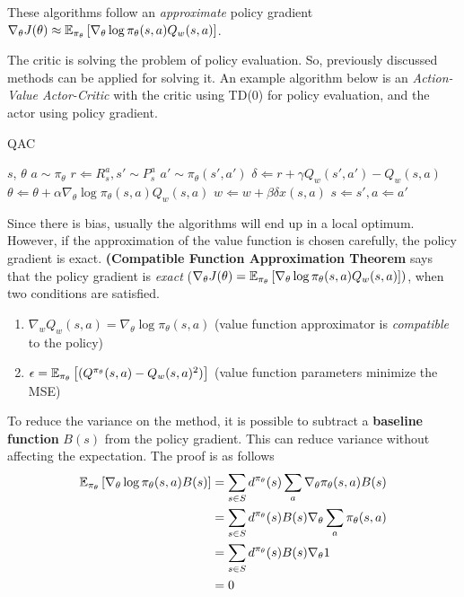 These algorithms follow an \textit{approximate} policy gradient $\nabla_\theta J(\theta) \approx \operatorname{\mathbb{E}}_{\pi_\theta} \left[\nabla_\theta \log \pi_\theta(s, a) Q_w(s, a)\right]$.

The critic is solving the problem of policy evaluation. So, previously discussed methods can be applied for solving it. An example algorithm below is an \textit{Action-Value Actor-Critic} with the critic using TD(0) for policy evaluation, and the actor using policy gradient.

\begin{algorithm}[H]
	\caption{QAC}
	\label{alg:QAC}
	\begin{algorithmic}
		\REQUIRE $s$, $\theta$
		\STATE $a \sim \pi_\theta$
			\STATE $r \Leftarrow R^a_s, s' \sim P^a_s$
			\STATE $a' \sim \pi_\theta(s', a')$
			\STATE $\delta \Leftarrow r + \gamma Q_w(s', a') - Q_w(s, a)$
			\STATE $\theta \Leftarrow \theta + \alpha \nabla_\theta \log \pi_\theta(s, a) Q_w(s, a)$
			\STATE $w \Leftarrow w + \beta \delta x(s, a)$
			\STATE $s \Leftarrow s', a \Leftarrow a'$
		\ENDFOR
	\end{algorithmic}
\end{algorithm}

Since there is bias, usually the algorithms will end up in a local optimum. However, if the approximation of the value function is chosen carefully, the policy gradient is exact. \textbf{(Compatible Function Approximation Theorem} says that the policy gradient is \textit{exact} ($\nabla_\theta J(\theta) = \operatorname{\mathbb{E}}_{\pi_\theta} \left[\nabla_\theta \log \pi_\theta(s, a) Q_w(s, a)\right])$, when two conditions are satisfied.

\begin{enumerate}
	\item $\nabla_w Q_w(s, a) = \nabla_\theta \log \pi_\theta(s, a)$ (value function approximator is \textit{compatible} to the policy)
	\item $\epsilon = \operatorname{\mathbb{E}}_{\pi_\theta} \left[(Q^{\pi_\theta}(s, a) - Q_w(s, a)^2)\right]$ (value function parameters minimize the MSE)
\end{enumerate}

To reduce the variance on the method, it is possible to subtract a \textbf{baseline function} $B(s)$ from the policy gradient. This can reduce variance without affecting the expectation. The proof is as follows
\begin{equation*}
	\begin{aligned}
		\operatorname{\mathbb{E}}_{\pi_\theta} \left[\nabla_\theta \log \pi_\theta(s, a)B(s)\right] & = \sum_{s \in S} d^{\pi_\theta}(s) \sum_a \nabla_\theta \pi_\theta(s, a)B(s)\\
		& = \sum_{s \in S} d^{\pi_\theta}(s) B(s) \nabla_\theta \sum_a \pi_\theta(s, a)\\
		& = \sum_{s \in S} d^{\pi_\theta}(s) B(s) \nabla_\theta 1\\
		& = 0
	\end{aligned}
\end{equation*}

